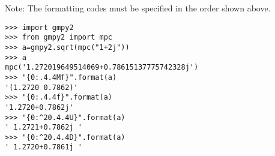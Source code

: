 Note: The formatting codes must be specified in the order shown above.

\begin{lstlisting}
>>> import gmpy2
>>> from gmpy2 import mpc
>>> a=gmpy2.sqrt(mpc("1+2j"))
>>> a
mpc('1.272019649514069+0.78615137775742328j')
>>> "{0:.4.4Mf}".format(a)
'(1.2720 0.7862)'
>>> "{0:.4.4f}".format(a)
'1.2720+0.7862j'
>>> "{0:^20.4.4U}".format(a)
' 1.2721+0.7862j '
>>> "{0:^20.4.4D}".format(a)
' 1.2720+0.7861j '
\end{lstlisting}


